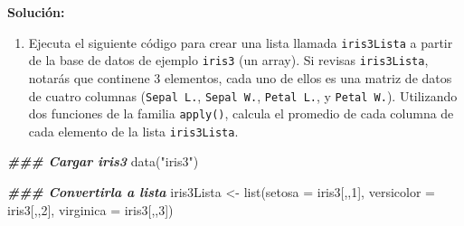 \documentclass[
]{article}
\newenvironment{Shaded}{\begin{snugshade}}{\end{snugshade}}
\newcommand{\AttributeTok}[1]{\textcolor[rgb]{0.77,0.63,0.00}{#1}}
\newcommand{\CommentTok}[1]{\textcolor[rgb]{0.56,0.35,0.01}{\textit{#1}}}
\newcommand{\DecValTok}[1]{\textcolor[rgb]{0.00,0.00,0.81}{#1}}
\newcommand{\DocumentationTok}[1]{\textcolor[rgb]{0.56,0.35,0.01}{\textbf{\textit{#1}}}}
\newcommand{\FunctionTok}[1]{\textcolor[rgb]{0.00,0.00,0.00}{#1}}
\newcommand{\NormalTok}[1]{#1}
\newcommand{\OtherTok}[1]{\textcolor[rgb]{0.56,0.35,0.01}{#1}}
\newcommand{\SpecialCharTok}[1]{\textcolor[rgb]{0.00,0.00,0.00}{#1}}
\newcommand{\StringTok}[1]{\textcolor[rgb]{0.31,0.60,0.02}{#1}}
\providecommand{\tightlist}{%
  \setlength{\itemsep}{0pt}\setlength{\parskip}{0pt}}
\theoremstyle{definition}
\theoremstyle{definition}
\theoremstyle{definition}
\theoremstyle{definition}
\theoremstyle{remark}
\begin{document}
\textbf{Solución:}

\begin{Shaded}
\end{Shaded}

\begin{enumerate}
\def\labelenumi{\arabic{enumi}.}
\tightlist
\item
  Ejecuta el siguiente código para crear una lista llamada \texttt{iris3Lista} a partir de la base de datos de ejemplo \texttt{iris3} (un array). Si revisas \texttt{iris3Lista}, notarás que continene 3 elementos, cada uno de ellos es una matriz de datos de cuatro columnas (\texttt{Sepal\ L.}, \texttt{Sepal\ W.}, \texttt{Petal\ L.}, y \texttt{Petal\ W.}). Utilizando dos funciones de la familia \texttt{apply()}, calcula el promedio de cada columna de cada elemento de la lista \texttt{iris3Lista}.
\end{enumerate}

\begin{Shaded}
\begin{Highlighting}[]
\DocumentationTok{\#\#\# Cargar iris3}
\FunctionTok{data}\NormalTok{(}\StringTok{"iris3"}\NormalTok{)}

\DocumentationTok{\#\#\# Convertirla a lista}
\NormalTok{iris3Lista }\OtherTok{\textless{}{-}} \FunctionTok{list}\NormalTok{(}\AttributeTok{setosa =}\NormalTok{ iris3[,,}\DecValTok{1}\NormalTok{],}
                \AttributeTok{versicolor =}\NormalTok{ iris3[,,}\DecValTok{2}\NormalTok{],}
                \AttributeTok{virginica =}\NormalTok{ iris3[,,}\DecValTok{3}\NormalTok{])}
\end{Highlighting}
\end{Shaded}
\end{document}
